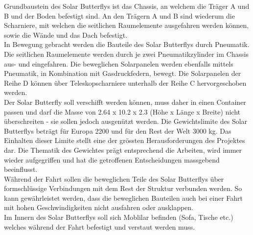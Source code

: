 Grundbaustein des Solar Butterflys ist das Chassis, an welchem die Träger A und B und der Boden befestigt sind. An den Trägern A und B sind wiederum die Scharniere, mit welchen die seitlichen Raumelemente ausgefahren werden können, sowie die Wände und das Dach befestigt.\\
In Bewegung gebracht werden die Bauteile des Solar Butterflys durch Pneumatik. Die seitlichen Raumelemente werden durch je zwei Pneumatikzylinder im Chassis aus- und eingefahren. Die beweglichen Solarpanelen werden ebenfalls mittels Pneumatik, in Kombination mit Gasdruckfedern, bewegt. Die Solarpanelen der Reihe D können über Teleskopscharniere unterhalb der Reihe C hervorgeschoben werden.\\
Der Solar Butterfly soll verschifft werden können, muss daher in einen Container passen und darf die Masse von 2.64 x 10.2 x 2.3 (Höhe x Länge x Breite) nicht überschreiten - sie sollen jedoch ausgenützt werden. Die Gewichtslimite des Solar Butterflys beträgt für Europa 2200 und für den Rest der Welt 3000 kg. Das Einhalten dieser Limite stellt eine der grössten Herausforderungen des Projektes dar. Die Thematik des Gewichtes prägt entsprechend die Arbeiten, wird immer wieder aufgegriffen und hat die getroffenen Entscheidungen massgebend beeinflusst.\\
Während der Fahrt sollen die beweglichen Teile des Solar Butterflys über formschlüssige Verbindungen mit dem Rest der Struktur verbunden werden. So kann gewährleistet werden, dass die beweglichen Bauteilen auch bei einer Fahrt mit hohen Geschwindigkeiten nicht ausfahren oder ausklappen.\\
Im Innern des Solar Butterflys soll sich Moblilar befinden (Sofa, Tische etc.) welches während der Fahrt befestigt und verstaut werden muss.

\newpage

